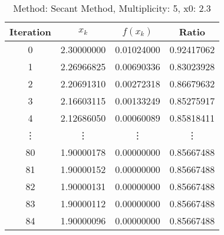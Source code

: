 \begin{table}
\centering
\caption{Method: Secant Method, Multiplicity: 5, x0: 2.3}
\label{tab:table_Secant_Method_5_2_3}
\begin{tabular}{c c c c}
\toprule
Iteration &      $x_k$ &   $f(x_k)$ &      Ratio \\
\midrule
        0 & 2.30000000 & 0.01024000 & 0.92417062 \\
        1 & 2.26966825 & 0.00690336 & 0.83023928 \\
        2 & 2.20691310 & 0.00272318 & 0.86679632 \\
        3 & 2.16603115 & 0.00133249 & 0.85275917 \\
        4 & 2.12686050 & 0.00060089 & 0.85818411 \\
   \vdots &     \vdots &     \vdots &     \vdots \\
       80 & 1.90000178 & 0.00000000 & 0.85667488 \\
       81 & 1.90000152 & 0.00000000 & 0.85667488 \\
       82 & 1.90000131 & 0.00000000 & 0.85667488 \\
       83 & 1.90000112 & 0.00000000 & 0.85667488 \\
       84 & 1.90000096 & 0.00000000 & 0.85667488 \\
\bottomrule
\end{tabular}
\end{table}
